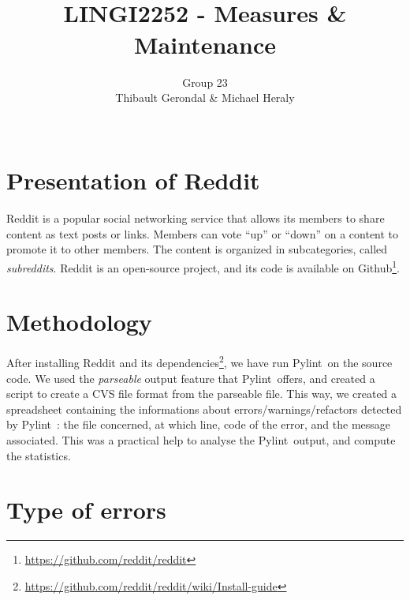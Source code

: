 \documentclass[11pt, a4paper]{article}
\title{\tbf{UCL} \\
	LINGI2252 - Measures \& Maintenance}
\author{Group 23 \\
		Thibault Gerondal \& Michael Heraly \\
		\\
		\tit{Teacher: Kim Mens}}
\newcommand{\tit}[1]{\textit{#1}}
\newcommand{\pyl}{\textsf{Pylint}\ }
\begin{document}
\maketitle


\section*{Presentation of Reddit}

Reddit is a popular social networking service that allows its members to share content as text posts or links.
Members can vote ``up'' or ``down'' on a content to promote it to other members.
The content is organized in subcategories, called \tit{subreddits}.
Reddit is an open-source project, and its code is available on Github\footnote{\url{https://github.com/reddit/reddit}}.


\section{Methodology}

After installing Reddit and its dependencies\footnote{\url{https://github.com/reddit/reddit/wiki/Install-guide}}, we have run \pyl on the source code.
We used the \tit{parseable} output feature that \pyl offers, and created a script to create a CVS file format from the parseable file.
This way, we created a spreadsheet containing the informations about errors/warnings/refactors detected by \pyl: the file concerned, at which line, code of the error, and the message associated.
This was a practical help to analyse the \pyl output, and compute the statistics.


\section{Type of errors}
\end{document}
